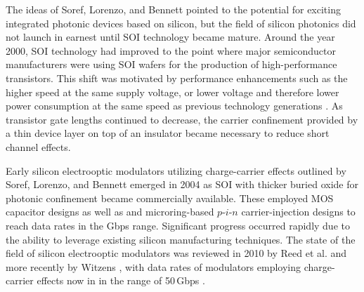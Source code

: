 The ideas of Soref, Lorenzo, and Bennett pointed to the potential for exciting integrated photonic devices based on silicon, but the field of silicon photonics did not launch in earnest until SOI technology became mature. Around the year 2000, SOI technology had improved to the point where major semiconductor manufacturers were using SOI wafers for the production of high-performance transistors. This shift was motivated by performance enhancements such as the higher speed at the same supply voltage, or lower voltage and therefore lower power consumption at the same speed as previous technology generations \cite{cecr2003}. As transistor gate lengths continued to decrease, the carrier confinement provided by a thin device layer on top of an insulator became necessary to reduce short channel effects.

Early silicon electrooptic modulators utilizing charge-carrier effects outlined by Soref, Lorenzo, and Bennett emerged in 2004 as SOI with thicker buried oxide for photonic confinement became commercially available. These employed MOS capacitor designs \cite{lijo2004,lisa2005} as well as and microring-based \cite{xusc2005,xuma2007} $p$-$i$-$n$ carrier-injection designs to reach data rates in the Gbps range. Significant progress occurred rapidly due to the ability to leverage existing silicon manufacturing techniques. The state of the field of silicon electrooptic modulators was reviewed in 2010 by Reed et al. \cite{rema2010} and more recently by Witzens \cite{wi2018}, with data rates of modulators employing charge-carrier effects now in in the range of 50\,Gbps \cite{pasa2015}. 

